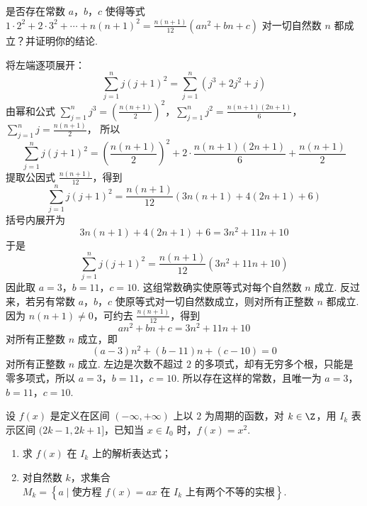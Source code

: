 \begin{problem}
是否存在常数 \(a\)，\(b\)，\(c\) 使得等式 \(1 \cdot 2^2 + 2 \cdot 3^2 + \cdots + n(n + 1)^2 = \frac{n(n + 1)}{12}(an^2 + bn + c)\) 对一切自然数 \(n\) 都成立？并证明你的结论.
\end{problem}

\begin{solution}
将左端逐项展开：
\[
\sum_{j=1}^{n}j(j+1)^2=\sum_{j=1}^{n}(j^3+2j^2+j)
\]
由幂和公式
\(\sum_{j=1}^{n}j^3=\left(\frac{n(n+1)}{2}\right)^2\)，\(\sum_{j=1}^{n}j^2=\frac{n(n+1)(2n+1)}{6}\)，\(\sum_{j=1}^{n}j=\frac{n(n+1)}{2}\)，
所以
\[
\sum_{j=1}^{n}j(j+1)^2=\left(\frac{n(n+1)}{2}\right)^2+2\cdot\frac{n(n+1)(2n+1)}{6}+\frac{n(n+1)}{2}
\]
提取公因式 \(\frac{n(n+1)}{12}\)，得到
\[
\sum_{j=1}^{n}j(j+1)^2=\frac{n(n+1)}{12}\left(3n(n+1)+4(2n+1)+6\right)
\]
括号内展开为
\[
3n(n+1)+4(2n+1)+6=3n^2+11n+10
\]
于是
\[
\sum_{j=1}^{n}j(j+1)^2=\frac{n(n+1)}{12}\left(3n^2+11n+10\right)
\]
因此取
\(a=3\)，\(b=11\)，\(c=10\).
这组常数确实使原等式对每个自然数 \(n\) 成立. 反过来，若另有常数 \(a\)，\(b\)，\(c\) 使原等式对一切自然数成立，则对所有正整数 \(n\) 都成立. 因为 \(n(n+1)\neq0\)，可约去 \(\frac{n(n+1)}{12}\)，得到
\[
an^2+bn+c=3n^2+11n+10
\]
对所有正整数 \(n\) 成立，即
\[
(a-3)n^2+(b-11)n+(c-10)=0
\]
对所有正整数 \(n\) 成立. 左边是次数不超过 \(2\) 的多项式，却有无穷多个根，只能是零多项式，所以
\(a=3\)，\(b=11\)，\(c=10\).
所以存在这样的常数，且唯一为 \(a=3\)，\(b=11\)，\(c=10\).
\end{solution}

\begin{problem}
设 \(f(x)\) 是定义在区间 \((-\infty, +\infty)\) 上以 \(2\) 为周期的函数，对 \(k \in \Z\)，用 \(I_k\) 表示区间 \((2k - 1, 2k + 1]\)，已知当 \(x \in I_0\) 时，\(f(x) = x^2\).
\begin{enumerate}
\item 求 \(f(x)\) 在 \(I_k\) 上的解析表达式；
\item 对自然数 \(k\)，求集合 \(M_k = \left\{ a \mid \text{使方程 } f(x) = ax \text{ 在 } I_k \text{ 上有两个不等的实根} \right\}\).
\end{enumerate}
\end{problem}

